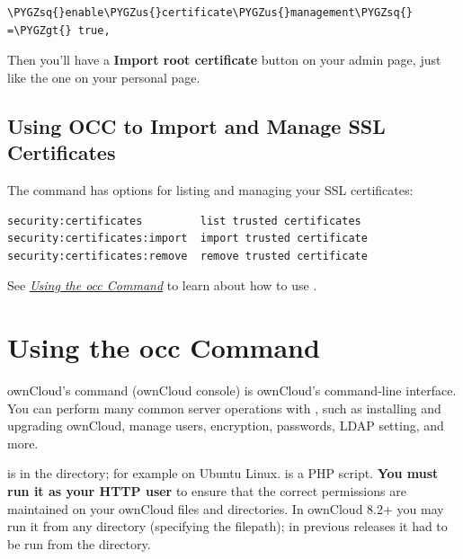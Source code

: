 \documentclass[letterpaper,10pt,english]{sphinxmanual}
\def\PYGZus{\char`\_}
\def\PYGZgt{\char`\>}
\def\PYGZsq{\char`\'}
\begin{document}
\begin{Verbatim}[commandchars=\\\{\}]
\PYGZsq{}enable\PYGZus{}certificate\PYGZus{}management\PYGZsq{} =\PYGZgt{} true,
\end{Verbatim}

Then you'll have a  \textbf{Import root certificate} button on your admin page, just like the one on your personal page.


\subsection{Using OCC to Import and Manage SSL Certificates}
\label{configuration_server/import_ssl_cert:using-occ-to-import-and-manage-ssl-certificates}
The  command has options for listing and managing your SSL certificates:

\begin{Verbatim}[commandchars=\\\{\}]
security:certificates         list trusted certificates
security:certificates:import  import trusted certificate
security:certificates:remove  remove trusted certificate
\end{Verbatim}

See {\hyperref[configuration_server/occ_command::doc]{\emph{Using the occ Command}}} to learn about how to use .


\section{Using the occ Command}
\label{configuration_server/occ_command:using-the-occ-command}\label{configuration_server/occ_command::doc}
ownCloud's  command (ownCloud console) is ownCloud's command-line
interface. You can perform many common server operations with , such as
installing and upgrading ownCloud, manage users, encryption, passwords, LDAP
setting, and more.

 is in the  directory; for example
 on Ubuntu Linux.  is a PHP script. \textbf{You must
run it as your HTTP user} to ensure that the correct permissions are maintained
on your ownCloud files and directories. In ownCloud 8.2+ you may run it from
any directory (specifying the filepath); in previous releases it had to be
run from the  directory.
\end{document}
